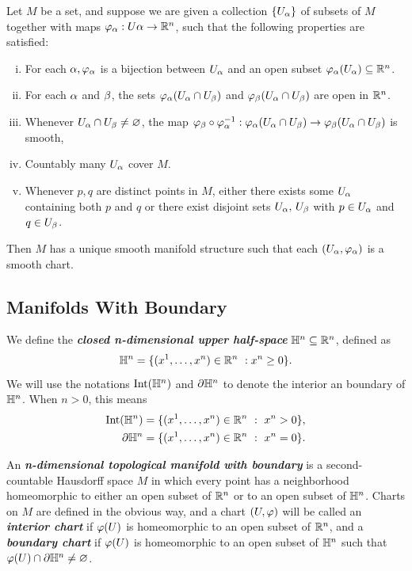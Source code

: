 \begin{lem}
Let $M$ be a set, and suppose we are given a collection $\{U_\alpha\}$ of subsets of $M$ together with maps $\varphi_\alpha:U\alpha\rightarrow \mathbb{R}^n$, such that the following properties are satisfied:
\begin{enumerate}[(i)]
    \item For each $\alpha, \varphi_\alpha$ is a bijection between $U_\alpha$ and an open subset $\varphi_\alpha(U_\alpha)\subseteq \mathbb{R}^n$.
    \item For each $\alpha$ and $\beta$, the sets $\varphi_\alpha(U_\alpha\cap U_\beta)$ and $\varphi_\beta(U_\alpha\cap U_\beta)$ are open in $\mathbb{R}^n$.
    \item Whenever $U_\alpha\cap U_\beta \neq \varnothing$, the map $\varphi_\beta\circ\varphi_\alpha^{-1}:\varphi_\alpha(U_\alpha\cap U_\beta)\rightarrow \varphi_\beta(U_\alpha \cap U_\beta)$ is smooth,
    \item Countably many $U_\alpha$ cover $M$.
    \item Whenever $p,q$ are distinct points in $M$, either there exists some $U_\alpha$ containing both $p$ and $q$ or there exist disjoint sets $U_\alpha,\,U_\beta$ with $p\in U_\alpha$ and $q\in U_\beta$.
\end{enumerate}
Then $M$ has a unique smooth manifold structure such that each $(U_\alpha, \varphi_\alpha)$ is a smooth chart.
\end{lem}

\subsection{Manifolds With Boundary}
\nl

\dfn We define the \textbf{\textit{closed n-dimensional upper half-space}} $\mathbb{H}^n\subseteq \mathbb{R}^n$, defined as
\[\mathbb{H}^n = \{(x^1,\ldots, x^n)\in \mathbb{R}^n\ : x^n \geq 0\}.\]
We will use the notations $\text{Int}(\mathbb{H}^n)$ and $\partial \mathbb{H}^n$ to denote the interior an boundary of $\mathbb{H}^n$. When $n > 0$, this means
\begin{align*}
    \text{Int}(\mathbb{H}^n) &= \{(x^1,\ldots,x^n)\in \mathbb{R}^n\ :\ x^n > 0\},\\
    \partial\mathbb{H}^n &= \{(x^1,\ldots,x^n)\in \mathbb{R}^n\ :\ x^n = 0\}.
\end{align*}

\dfn An \textbf{\textit{n-dimensional topological manifold with boundary}} is a second-countable Hausdorff space $M$ in which every point has a neighborhood homeomorphic to either an open subset of $\mathbb{R}^n$ or to an open subset of $\mathbb{H}^n$. Charts on $M$ are defined in the obvious way, and a chart $(U,\varphi)$ will be called an \textbf{\textit{interior chart}} if $\varphi(U)$ is homeomorphic to an open subset of $\mathbb{R}^n$, and a \textbf{\textit{boundary chart}} if $\varphi(U)$ is homeomorphic to an open subset of $\mathbb{H}^n$ such that $\varphi(U)\cap \partial\mathbb{H}^n\neq \varnothing$. 


